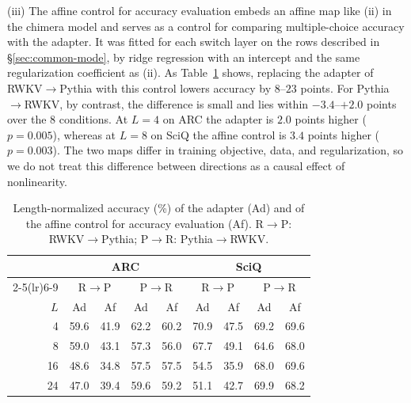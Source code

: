 \documentclass[conference]{IEEEtran}
\newcommand{\tabref}[1]{Table~\ref{#1}}
\newcommand{\RtoP}{RWKV$\to$\allowbreak Pythia}
\newcommand{\PtoR}{Pythia$\to$\allowbreak RWKV}
\begin{document}
(iii) The affine control for accuracy evaluation embeds an affine map like (ii) in the chimera model and serves as a control for
comparing multiple-choice accuracy with the adapter.
It was fitted for each switch layer on the rows described in \S\ref{sec:common-mode}, by ridge regression with an intercept
and the same regularization coefficient as (ii). As \tabref{tab:bench} shows,
replacing the adapter of \RtoP{} with this control lowers accuracy by $8$--$23$ points. For \PtoR{}, by contrast, the difference is
small and lies within $-3.4$--$+2.0$ points over the $8$ conditions.
At $L{=}4$ on ARC the adapter is $2.0$ points higher ($p{=}0.005$), whereas at $L{=}8$ on SciQ the affine control is $3.4$ points
higher ($p{=}0.003$). The two maps differ in training objective, data, and
regularization, so we do not treat this difference between directions as a causal effect of nonlinearity.

\begin{table}[!t]\centering\small
\caption{Length-normalized accuracy (\%) of the adapter (Ad) and of the affine control for accuracy evaluation (Af). R$\to$P: RWKV$\to$Pythia; P$\to$R: Pythia$\to$RWKV.}\label{tab:bench}
\setlength{\tabcolsep}{2.4pt}
\begin{tabular}{rcccccccc}\toprule
& \multicolumn{4}{c}{ARC} & \multicolumn{4}{c}{SciQ}\\
\cmidrule(lr){2-5}\cmidrule(lr){6-9}
& \multicolumn{2}{c}{R$\to$P} & \multicolumn{2}{c}{P$\to$R}
& \multicolumn{2}{c}{R$\to$P} & \multicolumn{2}{c}{P$\to$R}\\
$L$ & Ad & Af & Ad & Af & Ad & Af & Ad & Af\\\midrule
4  & 59.6 & 41.9 & 62.2 & 60.2 & 70.9 & 47.5 & 69.2 & 69.6\\
8  & 59.0 & 43.1 & 57.3 & 56.0 & 67.7 & 49.1 & 64.6 & 68.0\\
16 & 48.6 & 34.8 & 57.5 & 57.5 & 54.5 & 35.9 & 68.0 & 69.6\\
24 & 47.0 & 39.4 & 59.6 & 59.2 & 51.1 & 42.7 & 69.9 & 68.2\\\bottomrule
\end{tabular}
\end{table}
\end{document}
